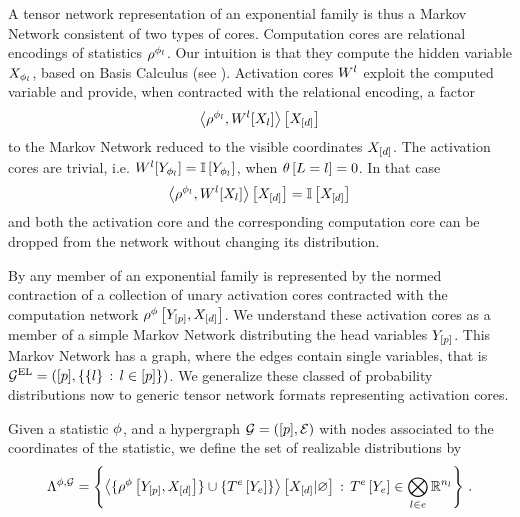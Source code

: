 A tensor network representation of an exponential family is thus a Markov Network consistent of two types of cores.
Computation cores are relational encodings of statistics $\rho^{\phi_{l}}$.
Our intuition is that they compute the hidden variable $X_{\phi_{l}}$, based on Basis Calculus (see ).
Activation cores $W^{l}$ exploit the computed variable and provide, when contracted with the relational encoding, a factor
\[ \left\langle \rho^{\phi_{l}}, W^{l}[X_{l}]\right\rangle \left[ X_{[d]} \right]  \]
to the Markov Network reduced to the visible coordinates $X_{[d]}$.
The activation cores are trivial, i.e. $W^{l}[Y_{\phi_{l}}]=\mathbb{I}\left[Y_{\phi_{l}}\right]$, when $\theta\left[L=l\right]=0$.
In that case
\[  \left\langle \rho^{\phi_{l}}, W^{l}[X_{l}]\right\rangle \left[ X_{[d]} \right]
= \mathbb{I}\left[X_{[d]}\right] \]
and both the activation core and the corresponding computation core can be dropped from the network without changing its distribution.

By  any member of an exponential family is represented by the normed contraction of a collection of unary activation cores contracted with the computation network $\rho^{\phi}\left[Y_{[p]},X_{[d]}\right]$.
We understand these activation cores as a member of a simple Markov Network distributing the head variables $Y_{[p]}$.
This Markov Network has a graph, where the edges contain single variables, that is $\mathcal{G}^{\mathrm{EL}}=([p],\{\{l\} \, : \, l\in[p]\})$.
We generalize these classed of probability distributions now to generic tensor network formats representing activation cores.

\begin{definition}
    \label{def:realizableStatDistributions}
    Given a statistic $\phi$, and a hypergraph $\mathcal{G}=([p],\mathcal{E})$ with nodes associated to the coordinates of the statistic, we define the set of realizable distributions by
    \begin{align*}
        \Lambda^{\phi,\mathcal{G}} = \left\{ \left\langle \{\rho^{\phi}\left[Y_{[p]},X_{[d]}\right]\} \cup \{T^{e}\left[Y_{e}\right]\}\right\rangle \left[ X_{[d]} | \varnothing \right]  \, : \,T^{e}\left[Y_{e}\right] \in\bigotimes_{l\in e}\mathbb{R}^{n_{l}} \right\} \, .
    \end{align*}
\end{definition}


